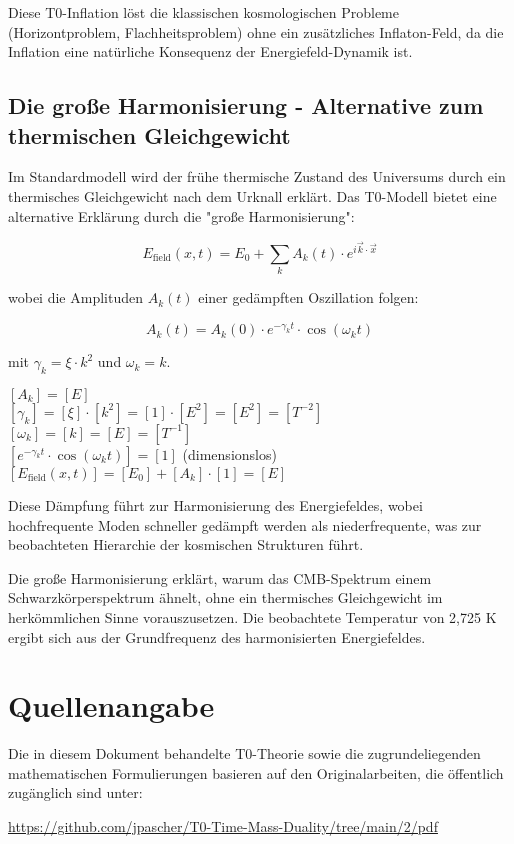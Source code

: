 \documentclass[12pt,a4paper]{article}
\theoremstyle{definition}
\begin{document}
Diese T0-Inflation löst die klassischen kosmologischen Probleme (Horizontproblem, Flachheitsproblem) ohne ein zusätzliches Inflaton-Feld, da die Inflation eine natürliche Konsequenz der Energiefeld-Dynamik ist.

\subsection{Die große Harmonisierung - Alternative zum thermischen Gleichgewicht}

Im Standardmodell wird der frühe thermische Zustand des Universums durch ein thermisches Gleichgewicht nach dem Urknall erklärt. Das T0-Modell bietet eine alternative Erklärung durch die "große Harmonisierung":

\begin{equation}
	E_{\text{field}}(x,t) = E_0 + \sum_k A_k(t) \cdot e^{i\vec{k}\cdot\vec{x}}
\end{equation}

wobei die Amplituden $A_k(t)$ einer gedämpften Oszillation folgen:

\begin{equation}
	A_k(t) = A_k(0) \cdot e^{-\gamma_k t} \cdot \cos(\omega_k t)
\end{equation}

mit $\gamma_k = \xi \cdot k^2$ und $\omega_k = k$.

\begin{einheitencheck}
	$[A_k] = [E]$ \checkmark\\
	$[\gamma_k] = [\xi] \cdot [k^2] = [1] \cdot [E^2] = [E^2] = [T^{-2}]$ \checkmark\\
	$[\omega_k] = [k] = [E] = [T^{-1}]$ \checkmark\\
	$[e^{-\gamma_k t} \cdot \cos(\omega_k t)] = [1]$ (dimensionslos) \checkmark\\
	$[E_{\text{field}}(x,t)] = [E_0] + [A_k] \cdot [1] = [E]$ \checkmark
\end{einheitencheck}

Diese Dämpfung führt zur Harmonisierung des Energiefeldes, wobei hochfrequente Moden schneller gedämpft werden als niederfrequente, was zur beobachteten Hierarchie der kosmischen Strukturen führt.

\begin{wichtig}
	Die große Harmonisierung erklärt, warum das CMB-Spektrum einem Schwarzkörperspektrum ähnelt, ohne ein thermisches Gleichgewicht im herkömmlichen Sinne vorauszusetzen. Die beobachtete Temperatur von 2,725 K ergibt sich aus der Grundfrequenz des harmonisierten Energiefeldes.
\end{wichtig}
\section{Quellenangabe}

Die in diesem Dokument behandelte T0-Theorie sowie die zugrundeliegenden mathematischen Formulierungen basieren auf den Originalarbeiten, die öffentlich zugänglich sind unter:

\begin{center}
	\url{https://github.com/jpascher/T0-Time-Mass-Duality/tree/main/2/pdf}
\end{center}	
\end{document}
